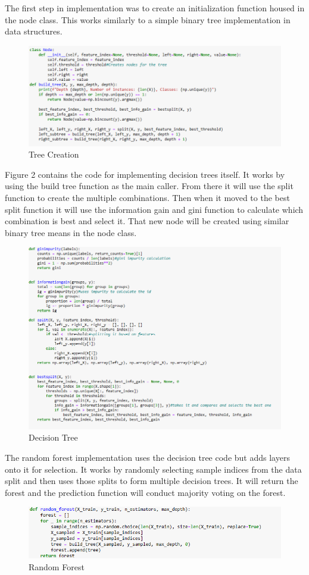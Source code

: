 \documentclass{article}
\begin{document}
The first step in implementation was to create an initialization function housed in the node class. This works similarly to a simple binary tree implementation in data structures. 
\begin{figure}
    \centering
    \includegraphics[width=0.5\linewidth]{a.png}
    \caption{Tree Creation}
    \label{fig:enter-label}
\end{figure}
Figure 2 contains the code for implementing decision trees itself. It works by using the build tree function as the main caller. From there it will use the split function to create the multiple combinations. Then when it moved to the best split function it will use the information gain and gini function to calculate which combination is best and select it. That new node will be created using similar binary tree means in the node class.
\begin{figure}
    \centering
    \includegraphics[width=0.5\linewidth]{decision tree.png}
    \caption{Decision Tree}
    \label{fig:enter-label}
\end{figure}
The random forest implementation uses the decision tree code but adds layers onto it for selection. It works by randomly selecting sample indices from the data split and then uses those splits to form multiple decision trees. It will return the forest and the prediction function will conduct majority voting on the forest.
\begin{figure}
    \centering
    \includegraphics[width=0.5\linewidth]{image.png}
    \caption{Random Forest}
    \label{fig:enter-label}
\end{figure}
\end{document}
